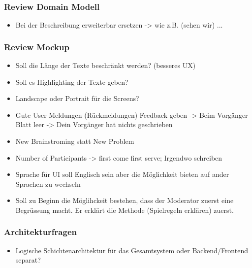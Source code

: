 \hypertarget{review-domain-modell}{%
\subsubsection*{Review Domain Modell}\label{review-domain-modell}}

\begin{itemize}

\item
  Bei der Beschreibung \grqq erweiterbar\grqq{} ersetzen -\textgreater{} wie z.B.
  (sehen wir) ...
\end{itemize}

\hypertarget{review-mockup}{%
\subsubsection*{Review Mockup}\label{review-mockup}}

\begin{itemize}

\item
  Soll die Länge der Texte beschränkt werden? (besseres UX)
\item
  Soll es Highlighting der Texte geben?
\item
  Landscape oder Portrait für die Screens?
\item
  Gute User Meldungen (Rückmeldungen) Feedback geben -\textgreater{}
  Beim Vorgänger Blatt leer -\textgreater{} Dein Vorgänger hat nichts
  geschrieben
\item
  New Brainstroming statt New Problem
\item
  Number of Participants -\textgreater{} first come first serve;
  Irgendwo schreiben
\item
  Sprache für UI soll Englisch sein aber die Möglichkeit bieten auf
  ander Sprachen zu wechseln
\item
  Soll zu Beginn die Möglihckeit bestehen, dass der Moderator zuerst
  eine Begrüssung macht. Er erklärt die Methode (Spielregeln erklären)
  zuerst.
\end{itemize}

\hypertarget{architekturfragen}{%
\subsubsection*{Architekturfragen}\label{architekturfragen}}

\begin{itemize}

\item
  Logische Schichtenarchitektur für das Gesamtsystem oder
  Backend/Frontend separat?
\end{itemize}

